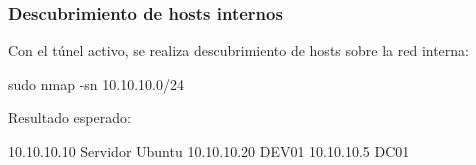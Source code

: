 \subsubsection*{Descubrimiento de hosts internos}

Con el túnel activo, se realiza descubrimiento de hosts sobre la red interna:

\begin{bashbox}
sudo nmap -sn 10.10.10.0/24
\end{bashbox}

Resultado esperado:

\begin{configbox}
10.10.10.10   Servidor Ubuntu
10.10.10.20   DEV01
10.10.10.5    DC01
\end{configbox}

